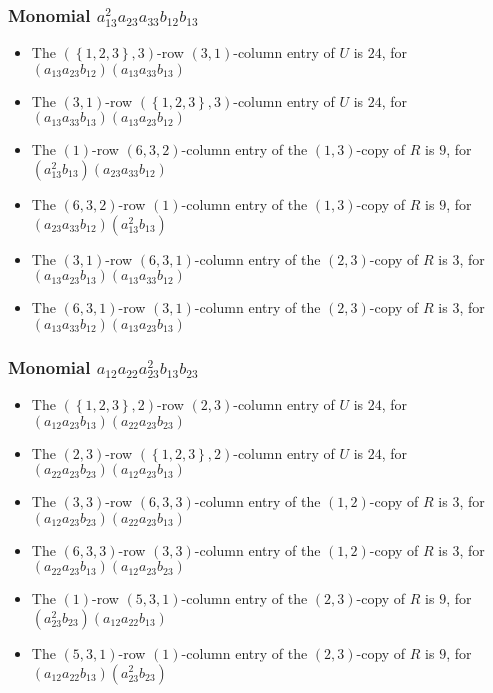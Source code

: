 \documentclass{article}
\begin{document}
\subsubsection{Monomial $ a_{13}^{2} a_{23} a_{33} b_{12} b_{13} $}

\begin{itemize}
\item The $ \left(\left\{1, 2, 3\right\}, 3\right) $-row $ \left(3, 1\right) $-column entry of $U$ is $ 24 $, for $( a_{13} a_{23} b_{12} )( a_{13} a_{33} b_{13} )$ 
\item The $ \left(3, 1\right) $-row $ \left(\left\{1, 2, 3\right\}, 3\right) $-column entry of $U$ is $ 24 $, for $( a_{13} a_{33} b_{13} )( a_{13} a_{23} b_{12} )$ 
\item The $(1)$-row $(6, 3, 2)$-column entry of the $ \left(1, 3\right) $-copy of $R$ is $ 9 $, for $( a_{13}^{2} b_{13} )( a_{23} a_{33} b_{12} )$ 
\item The $(6, 3, 2)$-row $(1)$-column entry of the $ \left(1, 3\right) $-copy of $R$ is $ 9 $, for $( a_{23} a_{33} b_{12} )( a_{13}^{2} b_{13} )$ 
\item The $(3, 1)$-row $(6, 3, 1)$-column entry of the $ \left(2, 3\right) $-copy of $R$ is $ 3 $, for $( a_{13} a_{23} b_{13} )( a_{13} a_{33} b_{12} )$ 
\item The $(6, 3, 1)$-row $(3, 1)$-column entry of the $ \left(2, 3\right) $-copy of $R$ is $ 3 $, for $( a_{13} a_{33} b_{12} )( a_{13} a_{23} b_{13} )$ 
\end{itemize}
\subsubsection{Monomial $ a_{12} a_{22} a_{23}^{2} b_{13} b_{23} $}

\begin{itemize}
\item The $ \left(\left\{1, 2, 3\right\}, 2\right) $-row $ \left(2, 3\right) $-column entry of $U$ is $ 24 $, for $( a_{12} a_{23} b_{13} )( a_{22} a_{23} b_{23} )$ 
\item The $ \left(2, 3\right) $-row $ \left(\left\{1, 2, 3\right\}, 2\right) $-column entry of $U$ is $ 24 $, for $( a_{22} a_{23} b_{23} )( a_{12} a_{23} b_{13} )$ 
\item The $(3, 3)$-row $(6, 3, 3)$-column entry of the $ \left(1, 2\right) $-copy of $R$ is $ 3 $, for $( a_{12} a_{23} b_{23} )( a_{22} a_{23} b_{13} )$ 
\item The $(6, 3, 3)$-row $(3, 3)$-column entry of the $ \left(1, 2\right) $-copy of $R$ is $ 3 $, for $( a_{22} a_{23} b_{13} )( a_{12} a_{23} b_{23} )$ 
\item The $(1)$-row $(5, 3, 1)$-column entry of the $ \left(2, 3\right) $-copy of $R$ is $ 9 $, for $( a_{23}^{2} b_{23} )( a_{12} a_{22} b_{13} )$ 
\item The $(5, 3, 1)$-row $(1)$-column entry of the $ \left(2, 3\right) $-copy of $R$ is $ 9 $, for $( a_{12} a_{22} b_{13} )( a_{23}^{2} b_{23} )$ 
\end{itemize}
\end{document}
